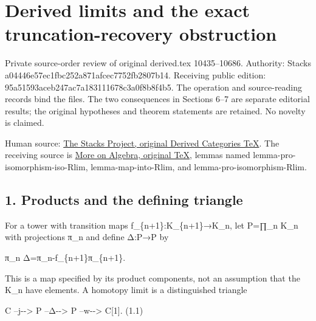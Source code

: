 \section{Derived limits and the exact truncation-recovery obstruction}\label{proofs-10435-10686-derived-limits-and-the-exact-truncation-recovery-obstruction}

Private source-order review of original derived.tex 10435–\allowbreak{}10686. Authority:\allowbreak{} Stacks a04446e5\allowbreak{}7ec1fbc2\allowbreak{}52a871af\allowbreak{}cec7752f\allowbreak{}b2807b14. Receiving public edition:\allowbreak{} 95a51593\allowbreak{}aceb247a\allowbreak{}c7a18311\allowbreak{}1678c3a0\allowbreak{}f8b8f4b5. The operation and source-reading records bind the files. The two consequences in Sections 6–\allowbreak{}7 are separate editorial results; the original hypotheses and theorem statements are retained. No novelty is claimed.

Human source:\allowbreak{} \href{https://github.com/stacks/stacks-project/blob/a04446e57ec1fbc252a871afcec7752fb2807b14/derived.tex\#L10435}{The Stacks Project,\allowbreak{} original Derived Categories TeX}. The receiving source is \href{https://github.com/stacks/stacks-project/blob/a04446e57ec1fbc252a871afcec7752fb2807b14/more-algebra.tex}{More on Algebra,\allowbreak{} original TeX},\allowbreak{} lemmas named lemma-pro-isomorphism-iso-Rlim,\allowbreak{} lemma-map-into-Rlim,\allowbreak{} and lemma-pro-isomorphism-Rlim.

\subsection{1. Products and the defining triangle}\label{proofs-10435-10686-products-and-the-defining-triangle}

For a tower with transition maps f\_\allowbreak{}\{n\allowbreak{}+1\}:\allowbreak{}K\_\allowbreak{}\{n\allowbreak{}+1\}\allowbreak{}→K\_\allowbreak{}n,\allowbreak{} let P\allowbreak{}=∏\_\allowbreak{}n K\_\allowbreak{}n with projections π\_\allowbreak{}n and define Δ:\allowbreak{}P\allowbreak{}→P by

π\_\allowbreak{}n Δ\allowbreak{}=π\_\allowbreak{}n-f\_\allowbreak{}\{n\allowbreak{}+1\}π\_\allowbreak{}\{n\allowbreak{}+1\}.

This is a map specified by its product components,\allowbreak{} not an assumption that the K\_\allowbreak{}n have elements. A homotopy limit is a distinguished triangle

C --j-\allowbreak{}-> P --Δ-\allowbreak{}-> P --w-\allowbreak{}-> C[1]\allowbreak{}. (1.1)\allowbreak{}


